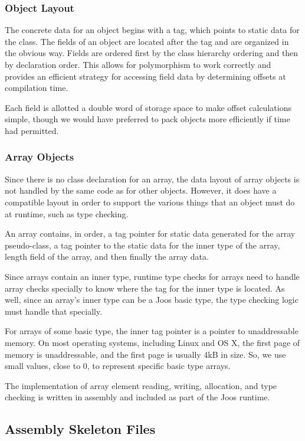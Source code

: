 \documentclass[pdftex,11pt,a4paper]{article}
\begin{document}
\subsubsection{Object Layout}

The concrete data for an object begins with a tag, which points to
static data for the class. The fields of an object are located after
the tag and are organized in the obvious way. Fields are ordered first
by the class hierarchy ordering and then by declaration order. This
allows for polymorphism to work correctly and provides an efficient
strategy for accessing field data by determining offsets at
compilation time.

Each field is allotted a double word of storage space to make offset
calculations simple, though we would have preferred to pack objects
more efficiently if time had permitted.

\subsubsection{Array Objects}

Since there is no class declaration for an array, the data layout of
array objects is not handled by the same code as for other
objects. However, it does have a compatible layout in order to support
the various things that an object must do at runtime, such as type
checking.

An array contains, in order, a tag pointer for static data generated for the
array pseudo-class, a tag pointer to the static data for the inner
type of the array, length field of the array, and then finally the
array data.

Since arrays contain an inner type, runtime type checks for arrays
need to handle array checks specially to know where the tag for the
inner type is located. As well, since an array's inner type can be a
Joos basic type, the type checking logic must handle that specially.

For arrays of some basic type, the inner tag pointer is a pointer to
unaddressable memory. On most operating systems, including Linux and
OS X, the first page of memory is unaddressable, and the first page is
usually 4kB in size. So, we use small values, close to 0, to represent
specific basic type arrays.

The implementation of array element reading, writing, allocation, and
type checking is written in assembly and included as part of the Joos
runtime.

\subsection{Assembly Skeleton Files}
\end{document}

